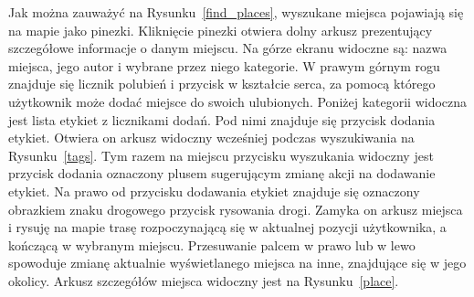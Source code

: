         Jak można zauważyć  na Rysunku~\ref{find_places}, wyszukane miejsca pojawiają się na mapie jako pinezki. Kliknięcie pinezki otwiera dolny arkusz prezentujący szczegółowe informacje o danym miejscu. 
        Na górze ekranu widoczne są: nazwa miejsca, jego autor i wybrane przez niego kategorie. W prawym górnym rogu znajduje się licznik polubień i przycisk w kształcie serca, za pomocą którego użytkownik
        może dodać miejsce do swoich ulubionych. Poniżej kategorii widoczna jest lista etykiet z licznikami dodań. Pod nimi znajduje się przycisk dodania etykiet. Otwiera on arkusz widoczny wcześniej podczas
        wyszukiwania na Rysunku~\ref{tags}. Tym razem na miejscu przycisku wyszukania widoczny jest przycisk dodania oznaczony plusem sugerującym zmianę akcji na dodawanie etykiet. Na prawo od przycisku dodawania
        etykiet znajduje się oznaczony obrazkiem znaku drogowego przycisk rysowania drogi. Zamyka on arkusz miejsca i rysuję na mapie trasę rozpoczynającą się w aktualnej pozycji użytkownika, a kończącą w
        wybranym miejscu. Przesuwanie palcem w prawo lub w lewo spowoduje zmianę aktualnie wyświetlanego miejsca na inne, znajdujące się w jego okolicy. Arkusz szczegółów miejsca widoczny jest na 
        Rysunku~\ref{place}.

